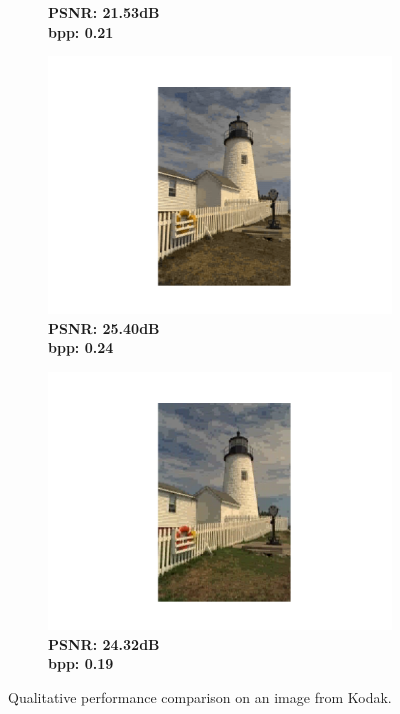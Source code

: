 \begin{figure}[t]
\begin{subfigure}{.19\textwidth}
        \vspace{-15pt}
        \caption*{\tiny \textbf{PSNR: 21.53dB \\ bpp: 0.21}}
	\end{subfigure}
    \begin{subfigure}{.19\textwidth}
		\centering
		\includegraphics[trim=5cm 1.5cm 5cm 1.7cm, clip, width=1\textwidth]{figures/kodim19_IMF - RGB_bpp_0.247.pdf}
		\vspace{-15pt}
		\caption*{\tiny \textbf{PSNR: 25.40dB \\ bpp: 0.24}}
	\end{subfigure}	
    \begin{subfigure}{.19\textwidth}
		\centering
		\includegraphics[trim=5cm 1.5cm 5cm 1.7cm, clip, width=1\textwidth]{figures/kodim19_IMF_bpp_0.191.pdf}
        \vspace{-15pt}
        \caption*{\tiny \textbf{PSNR: 24.32dB \\ bpp: 0.19}}
	\end{subfigure}
    \caption{Qualitative performance comparison on an image from Kodak.}
	\label{fig: qualitative_comparison_kodim19}
\end{figure}

